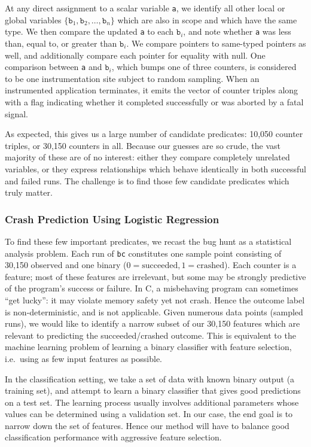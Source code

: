 At any direct assignment to a scalar variable \texttt{a}, we identify
all other local or global variables $\{ \mathtt{b}_1, \mathtt{b}_2,
\dots, \mathtt{b}_n \}$ which are also in scope and which have the
same type.  We then compare the updated \texttt{a} to each
$\mathtt{b}_i$, and note whether \texttt{a} was less than, equal to,
or greater than $\mathtt{b}_i$.  We compare pointers to same-typed
pointers as well, and additionally compare each pointer for equality
with null.  One comparison between \texttt{a} and $\mathtt{b}_i$,
which bumps one of three counters, is considered to be one
instrumentation site subject to random sampling.  When an instrumented
application terminates, it emits the vector of counter triples along
with a flag indicating whether it completed successfully or was
aborted by a fatal signal.

As expected, this gives us a large number of candidate predicates:
10,050 counter triples, or 30,150 counters in all.  Because our
guesses are so crude, the vast majority of these are of no interest:
either they compare completely unrelated variables, or they express
relationships which behave identically in both successful and failed
runs.  The challenge is to find those few candidate predicates which
truly matter.

\subsubsection{Crash Prediction Using Logistic Regression}

To find these few important predicates, we recast the bug hunt as a
statistical analysis problem.  Each run of \texttt{bc} constitutes one
sample point consisting of 30,150 observed  and one
binary  ($0 = \text{succeeded}, 1 = \text{crashed}$).
Each counter is a feature; most of these features are irrelevant, but
some may be strongly predictive of the program's success or failure.
In C, a misbehaving program can sometimes ``get lucky'': it may
violate memory safety yet not crash.  Hence the outcome label is
non-deterministic, and 
is not applicable.  Given numerous data points (sampled runs), we
would like to identify a narrow subset of our 30,150 features which
are relevant to predicting the succeeded/crashed outcome.  This is
equivalent to the machine learning problem of learning a binary
classifier with feature selection, i.e.\ using as few input features
as possible.

In the classification setting, we take a set of data with known binary
output (a training set), and attempt to learn a binary classifier that
gives good predictions on a test set.  The learning process usually
involves additional parameters whose values can be determined using a
validation set.  In our case, the end goal is to narrow down the set
of features.  Hence our method will have to balance good
classification performance with aggressive feature selection.

